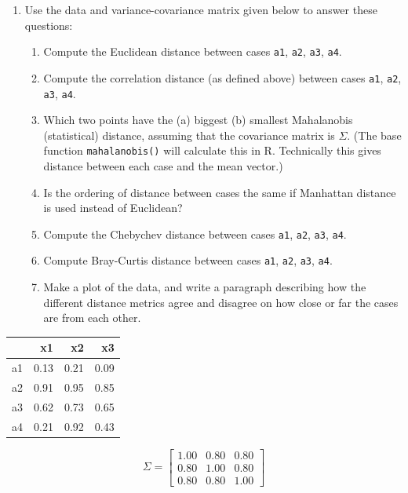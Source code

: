 \documentclass[
  letterpaper,
]{krantz}
\newcounter{none} %
\providecommand{\tightlist}{%
  \setlength{\itemsep}{0pt}\setlength{\parskip}{0pt}}
\begin{document}
\begin{enumerate}
\def\labelenumi{\arabic{enumi}.}
\tightlist
\item
  Use the data and variance-covariance matrix given below to answer
  these questions:

  \begin{enumerate}
  \def\labelenumii{\alph{enumii}.}
  \tightlist
  \item
    Compute the Euclidean distance between cases \texttt{a1},
    \texttt{a2}, \texttt{a3}, \texttt{a4}.
  \item
    Compute the correlation distance (as defined above) between cases
    \texttt{a1}, \texttt{a2}, \texttt{a3}, \texttt{a4}.
  \item
    Which two points have the (a) biggest (b) smallest Mahalanobis
    (statistical) distance, assuming that the covariance matrix is
    \(\Sigma\). (The base function \texttt{mahalanobis()} will calculate
    this in R. Technically this gives distance between each case and the
    mean vector.)
  \item
    Is the ordering of distance between cases the same if Manhattan
    distance is used instead of Euclidean?
  \item
    Compute the Chebychev distance between cases \texttt{a1},
    \texttt{a2}, \texttt{a3}, \texttt{a4}.
  \item
    Compute Bray-Curtis distance between cases \texttt{a1}, \texttt{a2},
    \texttt{a3}, \texttt{a4}.
  \item
    Make a plot of the data, and write a paragraph describing how the
    different distance metrics agree and disagree on how close or far
    the cases are from each other.
  \end{enumerate}
\end{enumerate}

{\def\LTcaptype{none} %
\begin{longtable}[]{@{}lrrr@{}}
\toprule\noalign{}
& x1 & x2 & x3 \\
\midrule\noalign{}
\endhead
\bottomrule\noalign{}
\endlastfoot
a1 & 0.13 & 0.21 & 0.09 \\
a2 & 0.91 & 0.95 & 0.85 \\
a3 & 0.62 & 0.73 & 0.65 \\
a4 & 0.21 & 0.92 & 0.43 \\
\end{longtable}
}

\[
\Sigma = \left[\begin{array}{ccc}
  1.00 & 0.80 & 0.80 \\
  0.80 & 1.00 & 0.80 \\
  0.80 & 0.80 & 1.00
\end{array}\right]
\]
\end{document}
